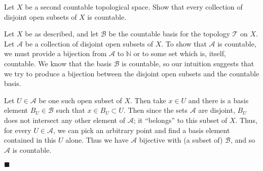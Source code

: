 \documentclass[12pt]{article}
\renewcommand{\qed}{\hfill$\blacksquare$}
\renewenvironment{proof}{\begin{addmargin}[1em]{0em}\begin{newproof}}{\end{newproof}\end{addmargin}\qed}
\newenvironment{problem}[2][Problem]{\begin{trivlist}
\item[\hskip \labelsep {\bfseries #1}\hskip \labelsep {\bfseries #2.}]}{\end{trivlist}}
\begin{document}
\begin{problem}{2-16}
Let $X$ be a second countable topological space. Show that every collection of disjoint open subsets of $X$ is countable.
\end{problem}
\begin{proof}
Let $X$ be as described, and let $\mathcal{B}$ be the countable basis for the topology $\mathcal{T}$ on $X$. Let $\mathcal{A}$ be a collection of disjoint open subsets of $X$. To show that $\mathcal{A}$ is countable, we must provide a bijection from $\mathcal{A}$ to $\mathbb{N}$ or to some set which is, itself, countable. We know that the basis $\mathcal{B}$ is countable, so our intuition suggests that we try to produce a bijection between the disjoint open subsets and the countable basis.

Let $U \in \mathcal{A}$ be one such open subset of $X$. Then take $x\in U$ and there is a basis element $B_U \in \mathcal{B}$ such that $x\in B_U \subset U$. Then since the sets $\mathcal{A}$ are disjoint, $B_U$ does not intersect any other element of $\mathcal{A}$; it ``belongs'' to this subset of $X$. Thus, for every $U \in \mathcal{A}$, we can pick an arbitrary point and find a basis element contained in this $U$ alone. Thus we have $\mathcal{A}$ bijective with (a subset of) $\mathcal{B}$, and so $\mathcal{A}$ is countable.
\end{proof}
\end{document}
